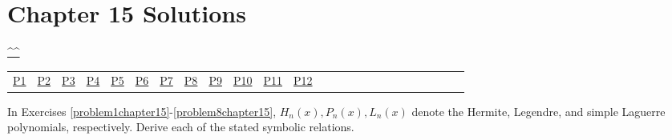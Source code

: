 \section{Chapter 15 Solutions}
\begin{center}\hyperref[toc]{\^{}\^{}}\end{center}
\begin{center}\begin{tabular}{lllllllllllllllllllllllll}
\hyperref[problem1chapter15]{P1} & \hyperref[problem2chapter15]{P2} & \hyperref[problem3chapter15]{P3} & \hyperref[problem4chapter15]{P4} & \hyperref[problem5chapter15]{P5} & \hyperref[problem6chapter15]{P6} & \hyperref[problem7chapter15]{P7} & \hyperref[problem8chapter15]{P8} & \hyperref[problem9chapter15]{P9} & \hyperref[problem10chapter15]{P10} & \hyperref[problem11chapter15]{P11} & \hyperref[problem12chapter15]{P12}
\end{tabular}\end{center}
\setcounter{problem}{0}
\setcounter{solution}{0}
In Exercises \ref{problem1chapter15}-\ref{problem8chapter15}, $H_n(x), P_n(x), L_n(x)$ denote the Hermite, Legendre, and simple Laguerre polynomials, respectively. Derive each of the stated symbolic relations.

